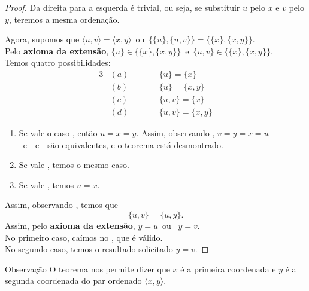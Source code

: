       \begin{proof}
      Da direita para a esquerda é trivial, ou seja, se substituir $u$ pelo $x$ e $v$ pelo $y$, teremos a mesma ordenação.

      Agora, supomos que $\langle u ,v\rangle = \langle x ,y\rangle$\ ou\ $\{\{u\},\{u, v\}\} = \{\{x\},\{x, y\}\}.$\\
      Pelo \textbf{axioma da extensão}, $\{u\} \in \{\{x\},\{x, y\}\}$\ e\ $\{u, v\} \in \{\{x\},\{x, y\}\}.$\\
      Temos quatro possibilidades:
      \begin{alignat*}{3}
         &(a)& \quad \quad & \{u\} = \{x\}\\
         &(b)& \quad \quad & \{u\} = \{x, y\}\\
         &(c)& \quad \quad & \{u, v\} = \{x\}\\
         &(d)& \quad \quad & \{u, v\} = \{x, y\}
      \end{alignat*}
      \begin{enumerate}[i]
      \item Se vale o caso \color{black}, então $u = x = y$. Assim, observando \color{black}, $v = y = x = u$\ e\ \color{black}\ e\ \color{black}\ são equivalentes, e o teorema está desmontrado.
      \item Se vale \color{black}, temos o mesmo caso.
      \item Se vale \color{black}, temos $u = x$.  
      \end{enumerate}
      Assim, observando \color{black}, temos que
      $$\{u, v\} = \{u, y\}.$$
      Assim, pelo \textbf{axioma da extensão}, $y = u$\ ou \ $y = v$.\\
      No primeiro caso, caímos no \color{black}, que é válido.\\
      No segundo caso, temos o resultado solicitado $y = v.$
      \end{proof}  
      \begin{mymdframed}{Observação}
      O teorema nos permite dizer que $x$ é a primeira coordenada e $y$ é a segunda coordenada do par ordenado $\langle x ,y\rangle$.
      \end{mymdframed}

